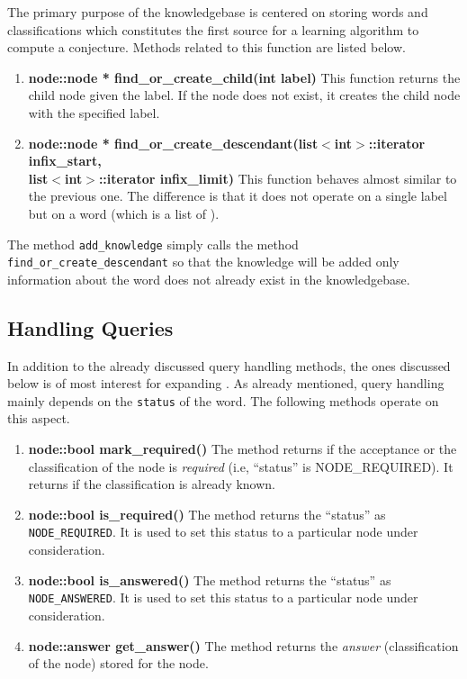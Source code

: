 The primary purpose of the knowledgebase is centered on storing words and classifications which constitutes the first source for a learning algorithm to compute a conjecture. Methods related to this function are listed below.
	
\begin{enumerate}
\item \textbf{node::node * find\_or\_create\_child(int label)} \vskip 1pt
	This function returns the child node given the label. If the node does not exist, it creates the child node with the specified label.
	
\item \textbf{node::node * find\_or\_create\_descendant(list$<$int$>$::iterator infix\_start, \\ list$<$int$>$::iterator infix\_limit)} \hfill \vskip 1pt
	This function behaves almost similar to the previous one. The difference is that it does not operate on a single label but on a word (which is a list of \integer). 
\end{enumerate}	

 The method \texttt{add\_knowledge} simply calls the method \texttt{find\_or\_create\_descendant} so that the knowledge will be added only information about the word does not already exist in the knowledgebase.


\subsection*{Handling Queries}
In addition to the already discussed query handling methods, the ones discussed below is of most interest for expanding \libalf. 
As already mentioned, query handling mainly depends on the \texttt{status} of the word. The following methods operate on this aspect. 
\begin{enumerate}
\item \textbf{node::bool mark\_required()} \vskip 1pt
The method returns \true if the acceptance or the classification of the node is \emph{required} (i.e, ``status'' is NODE\_REQUIRED). It returns \false if the classification is already known.
	
\item \textbf{node::bool is\_required()} \vskip 1pt
The method returns the ``status'' as \texttt{NODE\_REQUIRED}. It is used to set this status to a particular node under consideration.

\item \textbf{node::bool is\_answered()} \vskip 1pt
The method returns the ``status'' as \texttt{NODE\_ANSWERED}. It is used to set this status to a particular node under consideration.
	
\item \textbf{node::answer get\_answer()} \vskip 1pt
The method returns the \emph{answer} (classification of the node) stored for the node. 
\end{enumerate}

